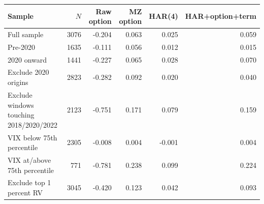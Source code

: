 \begin{tabular}{lrrrrr}
\toprule
Sample & $N$ & Raw option & MZ option & HAR(4) & HAR+option+term \\
\midrule
Full sample & 3076 & -0.204 & 0.063 & 0.025 & 0.059 \\
Pre-2020 & 1635 & -0.111 & 0.056 & 0.012 & 0.015 \\
2020 onward & 1441 & -0.227 & 0.065 & 0.028 & 0.070 \\
Exclude 2020 origins & 2823 & -0.282 & 0.092 & 0.020 & 0.040 \\
Exclude windows touching 2018/2020/2022 & 2123 & -0.751 & 0.171 & 0.079 & 0.159 \\
VIX below 75th percentile & 2305 & -0.008 & 0.004 & -0.001 & 0.004 \\
VIX at/above 75th percentile & 771 & -0.781 & 0.238 & 0.099 & 0.224 \\
Exclude top 1 percent RV & 3045 & -0.420 & 0.123 & 0.042 & 0.093 \\
\bottomrule
\end{tabular}
